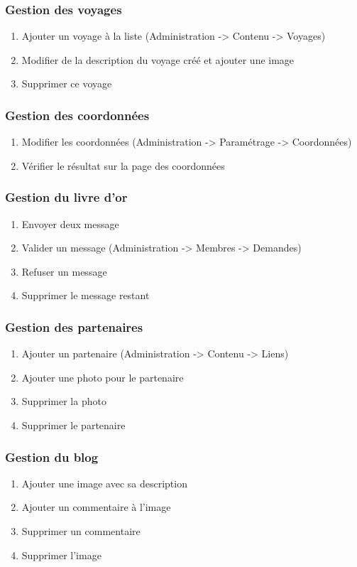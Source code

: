 \documentclass[11pt]{report}
\begin{document}
\subsubsection{Gestion des voyages}
\begin{enumerate}
\item Ajouter un voyage à la liste (Administration -> Contenu -> Voyages)
\item Modifier de la description du voyage créé et ajouter une image
\item Supprimer ce voyage
\end{enumerate}
\subsubsection{Gestion des coordonnées}
\begin{enumerate}
\item Modifier les coordonnées (Administration -> Paramétrage -> Coordonnées)
\item Vérifier le résultat sur la page des coordonnées
\end{enumerate}
\subsubsection{Gestion du livre d’or}
\begin{enumerate}
\item Envoyer deux message
\item Valider un message (Administration -> Membres -> Demandes)
\item Refuser un message
\item Supprimer le message restant
\end{enumerate}
\subsubsection{Gestion des partenaires}
\begin{enumerate}
\item Ajouter un partenaire (Administration -> Contenu -> Liens)
\item Ajouter une photo pour le partenaire
\item Supprimer la photo
\item Supprimer le partenaire
\end{enumerate}
\subsubsection{Gestion du blog}
\begin{enumerate}
\item Ajouter une image avec sa description
\item Ajouter un commentaire à l’image
\item Supprimer un commentaire
\item Supprimer l’image
\end{enumerate}
\end{document}
